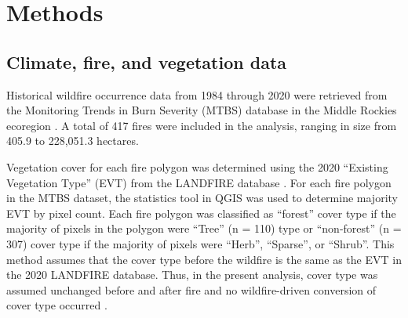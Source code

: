 \documentclass[11p]{article}
\begin{document}
\section{Methods}

\subsection{Climate, fire, and vegetation data}

Historical wildfire occurrence data from 1984 through 2020 were retrieved from the Monitoring Trends in Burn Severity (MTBS) database \citep{eidenshinkProjectMonitoringTrends2007} in the Middle Rockies ecoregion \citep{omernikEcoregionsConterminousUnited1987}. A total of 417 fires were included in the analysis, ranging in size from 405.9 to 228,051.3 hectares.

Vegetation cover for each fire polygon was determined using the 2020 ``Existing Vegetation Type'' (EVT) from the LANDFIRE database \citep{rollinsLANDFIRENationallyConsistent2009}. For each fire polygon in the MTBS dataset, the statistics tool in QGIS \citep{QGIS_software} was used to determine majority EVT by pixel count. Each fire polygon was classified as ``forest'' cover type if the majority of pixels in the polygon were ``Tree'' (n = 110) type or ``non-forest'' (n = 307) cover type if the majority of pixels were ``Herb'', ``Sparse'', or ``Shrub''. This method assumes that the cover type before the wildfire is the same as the EVT in the 2020 LANDFIRE database. Thus, in the present analysis, cover type was assumed unchanged before and after fire and no wildfire-driven conversion of cover type occurred \citep{coopWildfireDrivenForestConversion2020}.

\end{document}

